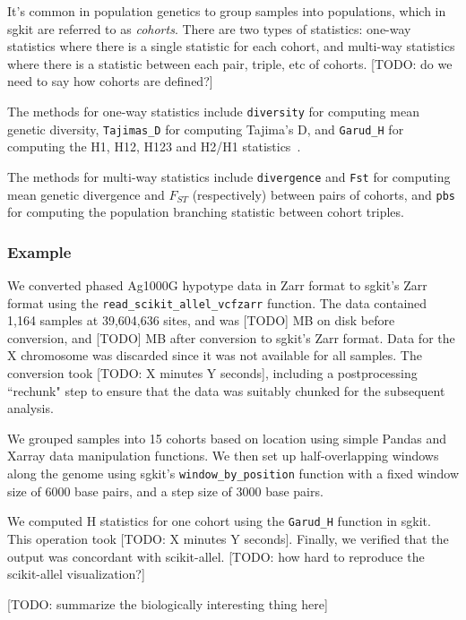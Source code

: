 \documentclass[9pt,lineno]{elife}
\newcommand{\sgapi}[1]{\texttt{#1}}
\begin{document}
It's common in population genetics to group samples into populations, which in
sgkit are referred to as \emph{cohorts}. There are two types of statistics: one-way
statistics where there is a single statistic for each cohort, and multi-way
statistics where there is a statistic between each pair, triple, etc of
cohorts. [TODO: do we need to say how cohorts are defined?]

The methods for one-way statistics include \sgapi{diversity} for computing mean
genetic diversity, \sgapi{Tajimas\_D} for computing Tajima’s D, and
\sgapi{Garud\_H} for
computing the H1, H12, H123 and H2/H1 statistics~\citep{garud2015recent}.

The methods for multi-way statistics include \sgapi{divergence} and
\sgapi{Fst} for
computing mean genetic divergence and $F_{ST}$ (respectively) between pairs of
cohorts, and \sgapi{pbs} for computing the population branching statistic between
cohort triples.

\subsubsection{Example}

We converted phased Ag1000G hypotype data in Zarr format
to sgkit's Zarr format
using the \sgapi{read\_scikit\_allel\_vcfzarr} function.
The data contained 1,164
samples at 39,604,636 sites, and was [TODO] MB on disk before conversion, and
[TODO] MB after conversion to sgkit's Zarr format. Data for the X chromosome
was discarded since it was not available for all samples. The conversion took
[TODO: X minutes Y seconds], including a postprocessing ``rechunk" step to
ensure that the data was suitably chunked for the subsequent analysis.

We grouped samples into 15 cohorts based on location using simple Pandas and
Xarray data manipulation functions. We then set up half-overlapping windows
along the genome using sgkit's \sgapi{window\_by\_position} function with a fixed
window size of 6000 base pairs, and a step size of 3000 base pairs.

We computed H statistics for one cohort using the \sgapi{Garud\_H} function in sgkit.
This operation took [TODO: X minutes Y seconds]. Finally, we verified that the
output was concordant with scikit-allel. [TODO: how hard to reproduce the
scikit-allel visualization?]

[TODO: summarize the biologically interesting thing here]
\end{document}
